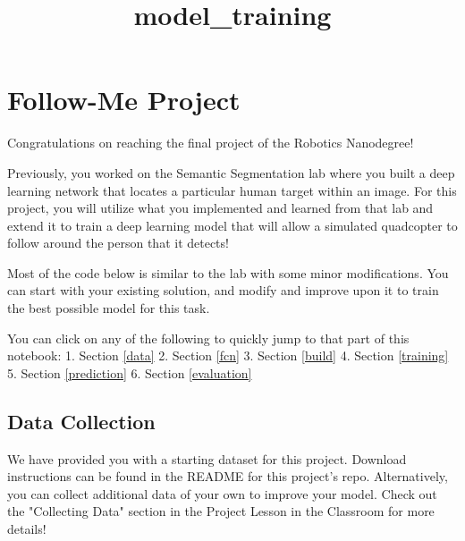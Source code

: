 \documentclass[11pt]{article}
\title{model\_training}
\begin{document}
    
    
    \maketitle
    
    

    
    \section{Follow-Me Project}\label{follow-me-project}

Congratulations on reaching the final project of the Robotics
Nanodegree!

Previously, you worked on the Semantic Segmentation lab where you built
a deep learning network that locates a particular human target within an
image. For this project, you will utilize what you implemented and
learned from that lab and extend it to train a deep learning model that
will allow a simulated quadcopter to follow around the person that it
detects!

Most of the code below is similar to the lab with some minor
modifications. You can start with your existing solution, and modify and
improve upon it to train the best possible model for this task.

You can click on any of the following to quickly jump to that part of
this notebook: 1. Section \ref{data} 2. Section \ref{fcn} 3.
Section \ref{build} 4. Section \ref{training} 5.
Section \ref{prediction} 6. Section \ref{evaluation}

    \subsection{Data Collection}\label{data-collection}

We have provided you with a starting dataset for this project. Download
instructions can be found in the README for this project's repo.
Alternatively, you can collect additional data of your own to improve
your model. Check out the "Collecting Data" section in the Project
Lesson in the Classroom for more details!
\end{document}
